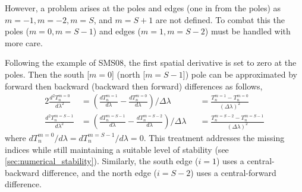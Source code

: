 \documentclass[12pt, onecolumn]{revtex4-2}    %
\begin{document}


However, a problem arises at the poles and edges (one in from the poles) as $m=-1, m=-2, m=S$, and $m=S+1$ are not defined.
To combat this the poles ($m=0, m=S-1$) and edges ($m=1, m=S-2$) must be handled with more care.

Following the example of SMS08, the first spatial derivative is set to zero at the poles.
Then the south [$m=0$] (north [$m=S-1$]) pole can be approximated by forward then backward (backward then forward) differences as follows,
\begin{alignat}{2}
    \frac{d^2 T^{m=0}_n}{d \lambda ^2}   & = \left(\frac{dT^{m=1}_n}{d\lambda} - \frac{dT^{m=0}_n}{d\lambda}\right) / \Delta\lambda     &  & = \frac{T^{m=1}_n - T^{m=0}_n}{(\Delta\lambda)^2}
    \label{eq:forward_backward}                                                                                                                                                                    \\
    \frac{d^2 T^{m=S-1}_n}{d \lambda ^2} & = \left(\frac{dT^{m=S-1}_n}{d\lambda} - \frac{dT^{m=S-2}_n}{d\lambda}\right) / \Delta\lambda &  & = \frac{T^{m=S-2}_n - T^{m=S-1}_n}{(\Delta\lambda)^2}
    \label{eq:backward_forward}
\end{alignat}
where $dT^{m=0}_n/d\lambda = dT^{m=S-1}_n/d\lambda = 0$.
This treatment addresses the missing indices while still maintaining a suitable level of stability (see \ref{sec:numerical_stability}).
Similarly, the south edge ($i=1$) uses a central-backward difference, and the north edge ($i=S-2$) uses a central-forward difference.
\end{document}
